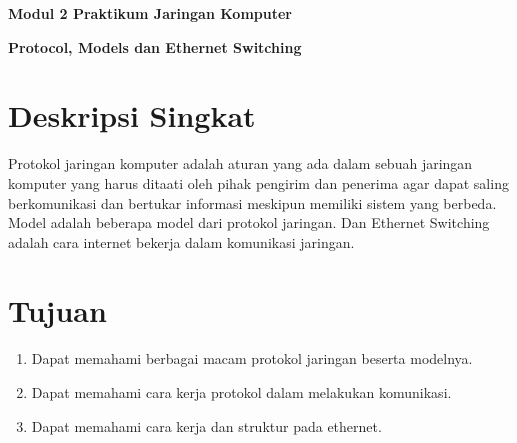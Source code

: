 \documentclass{article}
\begin{document}
    \begin{center}
        \textbf{Modul 2 Praktikum Jaringan Komputer}

        \textbf{Protocol, Models dan Ethernet Switching}
    \end{center}

    \section*{Deskripsi Singkat}
    Protokol jaringan komputer adalah aturan yang ada dalam sebuah jaringan komputer yang harus ditaati oleh pihak pengirim dan penerima agar dapat saling berkomunikasi dan bertukar informasi meskipun memiliki sistem yang berbeda. Model adalah beberapa model dari protokol jaringan. Dan Ethernet Switching adalah cara internet bekerja dalam komunikasi jaringan.

    \section*{Tujuan}
    \begin{enumerate}
        \item Dapat memahami berbagai macam protokol jaringan beserta modelnya.
        \item Dapat memahami cara kerja protokol dalam melakukan komunikasi.
        \item Dapat memahami cara kerja dan struktur pada ethernet.
    \end{enumerate}
\end{document}
